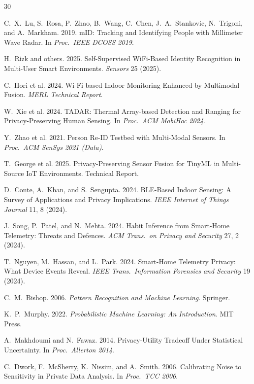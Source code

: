 \documentclass[sigconf,nonacm]{acmart}
\begin{document}
\sloppy

\begin{thebibliography}{30}

C.~X.~Lu, S.~Rosa, P.~Zhao, B.~Wang, C.~Chen, J.~A.~Stankovic,
N.~Trigoni, and A.~Markham. 2019. mID: Tracking and Identifying
People with Millimeter Wave Radar.
In \textit{Proc.\ IEEE DCOSS 2019}.

H.~Rizk and others. 2025. Self-Supervised WiFi-Based Identity
Recognition in Multi-User Smart Environments.
\textit{Sensors} 25 (2025).

C.~Hori et al. 2024. Wi-Fi based Indoor Monitoring Enhanced by
Multimodal Fusion. \textit{MERL Technical Report}.

W.~Xie et al. 2024. TADAR: Thermal Array-based Detection and
Ranging for Privacy-Preserving Human Sensing.
In \textit{Proc.\ ACM MobiHoc 2024}.

Y.~Zhao et al. 2021. Person Re-ID Testbed with Multi-Modal Sensors.
In \textit{Proc.\ ACM SenSys 2021 (Data)}.

T.~George et al. 2025. Privacy-Preserving Sensor Fusion for TinyML
in Multi-Source IoT Environments. Technical Report.

D.~Conte, A.~Khan, and S.~Sengupta. 2024. BLE-Based Indoor Sensing:
A Survey of Applications and Privacy Implications.
\textit{IEEE Internet of Things Journal} 11, 8 (2024).

J.~Song, P.~Patel, and N.~Mehta. 2024. Habit Inference from
Smart-Home Telemetry: Threats and Defences.
\textit{ACM Trans.\ on Privacy and Security} 27, 2 (2024).

T.~Nguyen, M.~Hassan, and L.~Park. 2024. Smart-Home Telemetry
Privacy: What Device Events Reveal.
\textit{IEEE Trans.\ Information Forensics and Security} 19 (2024).

C.~M.~Bishop. 2006. \textit{Pattern Recognition and Machine
Learning}. Springer.

K.~P.~Murphy. 2022. \textit{Probabilistic Machine Learning:
An Introduction}. MIT Press.

A.~Makhdoumi and N.~Fawaz. 2014. Privacy-Utility Tradeoff Under
Statistical Uncertainty. In \textit{Proc.\ Allerton 2014}.

C.~Dwork, F.~McSherry, K.~Nissim, and A.~Smith. 2006. Calibrating
Noise to Sensitivity in Private Data Analysis.
In \textit{Proc.\ TCC 2006}.


\end{thebibliography}
\end{document}
